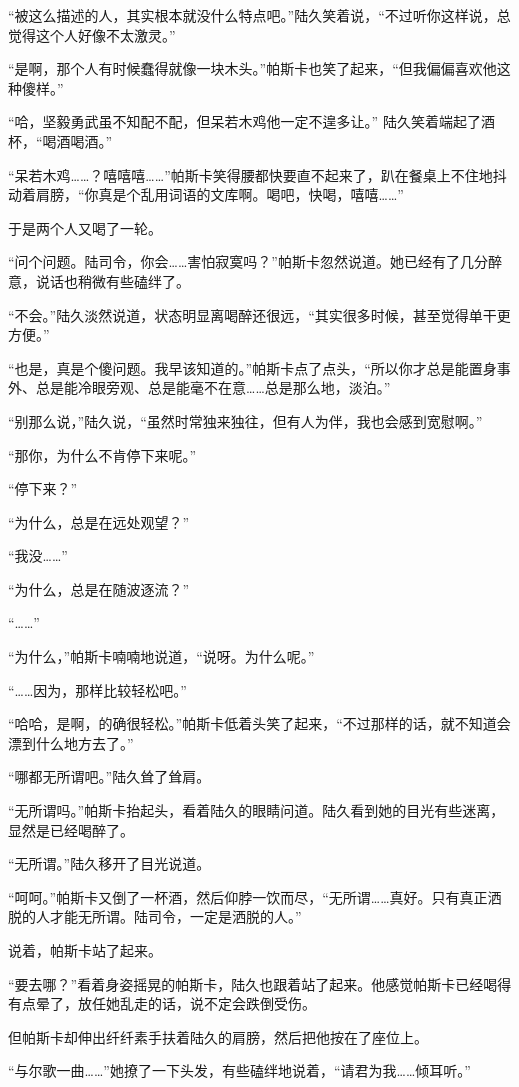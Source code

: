 “被这么描述的人，其实根本就没什么特点吧。”陆久笑着说，“不过听你这样说，总觉得这个人好像不太激灵。”

“是啊，那个人有时候蠢得就像一块木头。”帕斯卡也笑了起来，“但我偏偏喜欢他这种傻样。”

“哈，坚毅勇武虽不知配不配，但呆若木鸡他一定不遑多让。” 陆久笑着端起了酒杯，“喝酒喝酒。”

“呆若木鸡……？嘻嘻嘻……”帕斯卡笑得腰都快要直不起来了，趴在餐桌上不住地抖动着肩膀，“你真是个乱用词语的文库啊。喝吧，快喝，嘻嘻……”

于是两个人又喝了一轮。

“问个问题。陆司令，你会……害怕寂寞吗？”帕斯卡忽然说道。她已经有了几分醉意，说话也稍微有些磕绊了。

“不会。”陆久淡然说道，状态明显离喝醉还很远，“其实很多时候，甚至觉得单干更方便。”

“也是，真是个傻问题。我早该知道的。”帕斯卡点了点头，“所以你才总是能置身事外、总是能冷眼旁观、总是能毫不在意……总是那么地，淡泊。”

“别那么说，”陆久说，“虽然时常独来独往，但有人为伴，我也会感到宽慰啊。”

“那你，为什么不肯停下来呢。”

“停下来？”

“为什么，总是在远处观望？”

“我没……”

“为什么，总是在随波逐流？”

“……”

“为什么，”帕斯卡喃喃地说道，“说呀。为什么呢。”

“……因为，那样比较轻松吧。”

“哈哈，是啊，的确很轻松。”帕斯卡低着头笑了起来，“不过那样的话，就不知道会漂到什么地方去了。”

“哪都无所谓吧。”陆久耸了耸肩。

“无所谓吗。”帕斯卡抬起头，看着陆久的眼睛问道。陆久看到她的目光有些迷离，显然是已经喝醉了。

“无所谓。”陆久移开了目光说道。

“呵呵。”帕斯卡又倒了一杯酒，然后仰脖一饮而尽，“无所谓……真好。只有真正洒脱的人才能无所谓。陆司令，一定是洒脱的人。”

说着，帕斯卡站了起来。

“要去哪？”看着身姿摇晃的帕斯卡，陆久也跟着站了起来。他感觉帕斯卡已经喝得有点晕了，放任她乱走的话，说不定会跌倒受伤。

但帕斯卡却伸出纤纤素手扶着陆久的肩膀，然后把他按在了座位上。

“与尔歌一曲……”她撩了一下头发，有些磕绊地说着，“请君为我……倾耳听。”

